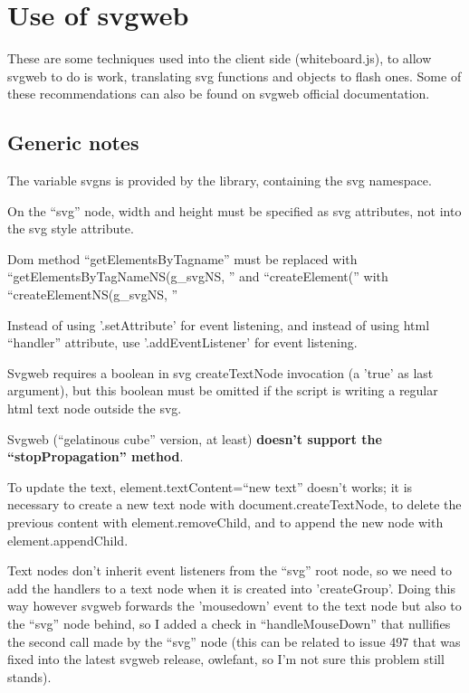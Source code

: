 \documentclass[10pt,a4paper,english]{book}
\begin{document}
\hypertarget{use-of-svgweb}{}
\section{Use of svgweb}
\label{use-of-svgweb}

These are some techniques used into the client side (whiteboard.js),
to allow svgweb to do is work, translating svg functions and objects
to flash ones. Some of these recommendations can also be found on
svgweb official documentation.



\hypertarget{generic-notes}{}
\subsection{Generic notes}
\label{generic-notes}

The variable svgns is provided by the library, containing the svg
namespace.

On the ``svg'' node, width and height must be specified as svg
attributes, not into the svg style attribute.

Dom method ``getElementsByTagname'' must be replaced with
``getElementsByTagNameNS(g{\_}svgNS, '' and ``createElement('' with
``createElementNS(g{\_}svgNS, ''

Instead of using '.setAttribute' for event listening, and instead of
using html ``handler'' attribute, use '.addEventListener' for event
listening.

Svgweb requires a boolean in svg createTextNode invocation (a 'true'
as last argument), but this boolean must be omitted if the script is
writing a regular html text node outside the svg.

Svgweb (``gelatinous cube'' version, at least) \textbf{doesn't support the
``stopPropagation'' method}.

To update the text, element.textContent=``new text'' doesn't works; it
is necessary to create a new text node with document.createTextNode,
to delete the previous content with element.removeChild, and to append
the new node with element.appendChild.

Text nodes don't inherit event listeners from the ``svg'' root node, so
we need to add the handlers to a text node when it is created into
'createGroup'. Doing this way however svgweb forwards the 'mousedown'
event to the text node but also to the ``svg'' node behind, so I added a
check in ``handleMouseDown'' that nullifies the second call made by the
``svg'' node (this can be related to issue 497 that was fixed into the
latest svgweb release, owlefant, so I'm not sure this problem still
stands).
\end{document}
